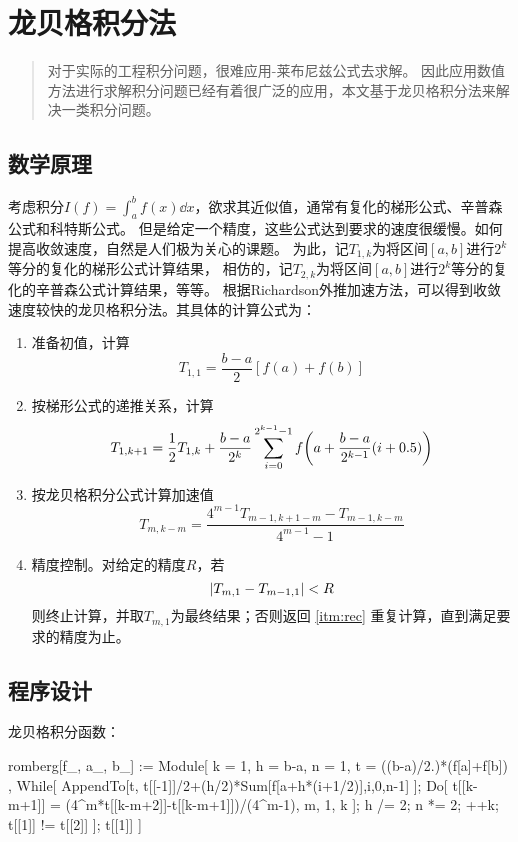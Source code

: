 \documentclass{hitgsrep}
\begin{document}
\maketitle

\section{龙贝格积分法}

\begin{abstract}
    对于实际的工程积分问题，很难应用-莱布尼兹公式去求解。
    因此应用数值方法进行求解积分问题已经有着很广泛的应用，本文基于龙贝格积分法来解决一类积分问题。
\end{abstract}

\subsection{数学原理}

考虑积分$I(f)=\int_a^b f(x)\dd{x}$，欲求其近似值，通常有复化的梯形公式、辛普森公式和科特斯公式。
但是给定一个精度，这些公式达到要求的速度很缓慢。如何提高收敛速度，自然是人们极为关心的课题。
为此，记$T_{1,k}$为将区间$[a,b]$进行$2^k$等分的复化的梯形公式计算结果，
相仿的，记$T_{2,k}$为将区间$[a,b]$进行$2^k$等分的复化的辛普森公式计算结果，等等。
根据Richardson外推加速方法，可以得到收敛速度较快的龙贝格积分法。其具体的计算公式为：
\begin{enumerate}
    \item 准备初值，计算
    $$
        T_{1,1}=\frac{b-a}{2}[f(a)+f(b)]
    $$
    \item\label{itm:rec} 按梯形公式的递推关系，计算
    $$
        T_{1,k+1}=\frac{1}{2}T_{1,k}+\frac{b-a}{2^k}\sum_{i=0}^{2^{k-1}-1}f\qty(a+\frac{b-a}{2^{k-1}}(i+0.5))
    $$
    \item 按龙贝格积分公式计算加速值
    $$
        T_{m,k-m}=\frac{4^{m-1}T_{m-1,k+1-m}-T_{m-1,k-m}}{4^{m-1}-1}
    $$
    \item 精度控制。对给定的精度$R$，若
    $$
        \abs{T_{m,1}-T_{m-1,1}}<R
    $$
    则终止计算，并取$T_{m,1}$为最终结果；否则返回 \ref{itm:rec} 重复计算，直到满足要求的精度为止。
\end{enumerate}

\subsection{程序设计}

龙贝格积分函数：
\begin{wlcode}
romberg[f_, {a_, b_}] := Module[
  {k = 1,
   h = b-a,
   n = 1,
   t = {((b-a)/2.)*(f[a]+f[b])}
  },
  While[
    AppendTo[t,
      t[[-1]]/2+(h/2)*Sum[f[a+h*(i+1/2)],{i,0,n-1}]
    ];
    Do[
      t[[k-m+1]] = (4^m*t[[k-m+2]]-t[[k-m+1]])/(4^m-1),
      {m, 1, k}
    ];
    h /= 2;
    n *= 2;
    ++k;
    t[[1]] != t[[2]]
  ];
  t[[1]]
]
\end{wlcode}
\end{document}
